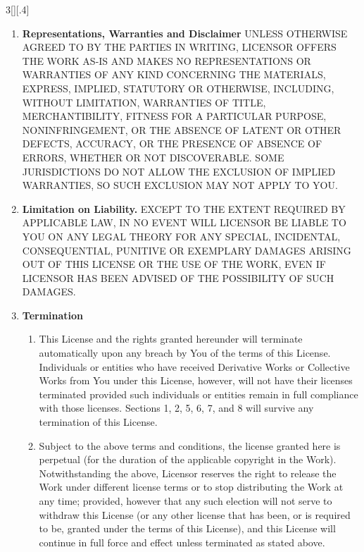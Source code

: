 \documentclass[8pt,a4paper]{article}
\begin{document}
\begin{multicols}{3}[][.4\paperwidth]
\begin{enumerate}
\begin{enumerate}
  \end{enumerate}


  \item \textbf{Representations, Warranties and Disclaimer}
        UNLESS OTHERWISE AGREED TO BY THE PARTIES IN WRITING, LICENSOR OFFERS THE WORK
        AS-IS AND MAKES NO REPRESENTATIONS OR WARRANTIES OF ANY KIND CONCERNING THE
        MATERIALS, EXPRESS, IMPLIED, STATUTORY OR OTHERWISE, INCLUDING, WITHOUT
        LIMITATION, WARRANTIES OF TITLE, MERCHANTIBILITY, FITNESS FOR A PARTICULAR
        PURPOSE, NONINFRINGEMENT, OR THE ABSENCE OF LATENT OR OTHER DEFECTS, ACCURACY,
        OR THE PRESENCE OF ABSENCE OF ERRORS, WHETHER OR NOT DISCOVERABLE. SOME
        JURISDICTIONS DO NOT ALLOW THE EXCLUSION OF IMPLIED WARRANTIES, SO SUCH
        EXCLUSION MAY NOT APPLY TO YOU.

  \item \textbf{Limitation on Liability.} EXCEPT TO THE EXTENT REQUIRED BY APPLICABLE LAW,
        IN NO EVENT WILL LICENSOR BE LIABLE TO YOU ON ANY LEGAL THEORY FOR ANY SPECIAL,
        INCIDENTAL, CONSEQUENTIAL, PUNITIVE OR EXEMPLARY DAMAGES ARISING OUT OF THIS
        LICENSE OR THE USE OF THE WORK, EVEN IF LICENSOR HAS BEEN ADVISED OF THE
        POSSIBILITY OF SUCH DAMAGES.

  \item \textbf{Termination}

  \begin{enumerate}

  \item This License and the rights granted hereunder will terminate
        automatically upon any breach by You of the terms of this License.
        Individuals or entities who have received Derivative Works or Collective
        Works from You under this License, however, will not have their licenses
        terminated provided such individuals or entities remain in full
        compliance with those licenses. Sections 1, 2, 5, 6, 7, and 8 will
        survive any termination of this License.
  \item Subject to the above terms and conditions, the license granted here is
        perpetual (for the duration of the applicable copyright in the Work).
        Notwithstanding the above, Licensor reserves the right to release the
        Work under different license terms or to stop distributing the Work at
        any time; provided, however that any such election will not serve to
        withdraw this License (or any other license that has been, or is required
        to be, granted under the terms of this License), and this License will
        continue in full force and effect unless terminated as stated above.


\end{enumerate}
\end{enumerate}
\end{multicols}
\end{document}
